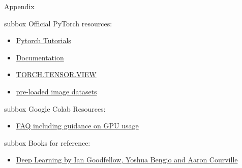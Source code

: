 \begin{multicols}{3}
\begin{textbox}{Appendix}
\begin{subbox}{subbox}{ Official PyTorch resources:}
\scriptsize
\begin{itemize}
    \item 
\href{https://pytorch.org/tutorials/}{Pytorch Tutorials}

\item 
\href{https://pytorch.org/docs/stable/tensors.html}{Documentation}

\item  
\href{https://pytorch.org/docs/stable/generated/torch.Tensor.view.html#torch.Tensor.view}{TORCH.TENSOR.VIEW}

\item  
\href{https://pytorch.org/vision/stable/datasets.html}{pre-loaded image datasets}

\end{itemize} 
\end{subbox}
\begin{subbox}{subbox}{ Google Colab Resources:}
\begin{itemize}
    \item 
    \href{https://research.google.com/colaboratory/faq.html}{FAQ including guidance on GPU usage}

 \end{itemize}
\end{subbox}
\begin{subbox}{subbox}{ Books for reference:}
\begin{itemize}
    \item 
    \href{https://www.deeplearningbook.org/}{Deep Learning by Ian Goodfellow, Yoshua Bengio and Aaron Courville}

 \end{itemize}
\end{subbox}
\end{textbox}
\end{multicols}